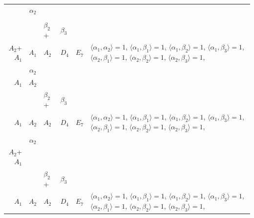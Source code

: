 \documentclass[12pt]{report}
\begin{document}
\begin{appendix}
{\begin{longtable}{rcl p{1cm}p{1cm}p{3cm} }
\\
\begin{tabular}{cc}$\alpha_1$+ & $\alpha_2$\\\tiny{  } & \tiny{  }\end{tabular} &\begin{tabular}{c} = \\~ \end{tabular} & \begin{tabular}{ccc}$\beta_1$+ & $\beta_2$+ & $\beta_3$\\\tiny{ $A_2$+$A_1$ } & \tiny{ $A_1$ } & \tiny{ $A_2$ }\end{tabular} & $D_4$ & $E_7$ & $\langle\alpha_1, \alpha_2\rangle=1$,  $\langle\alpha_1, \beta_1\rangle=1$, $\langle\alpha_1, \beta_2\rangle=1$, $\langle\alpha_1, \beta_3\rangle=1$, $\langle\alpha_2, \beta_1\rangle=1$, $\langle\alpha_2, \beta_2\rangle=1$, $\langle\alpha_2, \beta_3\rangle=1$, 
\\
\begin{tabular}{cc}$\alpha_1$+ & $\alpha_2$\\\tiny{ $A_1$ } & \tiny{ $A_2$ }\end{tabular} &\begin{tabular}{c} = \\~ \end{tabular} & \begin{tabular}{ccc}$\beta_1$+ & $\beta_2$+ & $\beta_3$\\\tiny{ $A_1$ } & \tiny{ $A_2$ } & \tiny{ $A_2$ }\end{tabular} & $D_4$ & $E_7$ & $\langle\alpha_1, \alpha_2\rangle=1$,  $\langle\alpha_1, \beta_1\rangle=1$, $\langle\alpha_1, \beta_2\rangle=1$, $\langle\alpha_1, \beta_3\rangle=1$, $\langle\alpha_2, \beta_1\rangle=1$, $\langle\alpha_2, \beta_2\rangle=1$, $\langle\alpha_2, \beta_3\rangle=1$, 
\\
\begin{tabular}{cc}$\alpha_1$+ & $\alpha_2$\\\tiny{ $A_2$+$A_1$ } & \tiny{  }\end{tabular} &\begin{tabular}{c} = \\~ \end{tabular} & \begin{tabular}{ccc}$\beta_1$+ & $\beta_2$+ & $\beta_3$\\\tiny{ $A_1$ } & \tiny{ $A_2$ } & \tiny{ $A_2$ }\end{tabular} & $D_4$ & $E_7$ & $\langle\alpha_1, \alpha_2\rangle=1$,  $\langle\alpha_1, \beta_1\rangle=1$, $\langle\alpha_1, \beta_2\rangle=1$, $\langle\alpha_1, \beta_3\rangle=1$, $\langle\alpha_2, \beta_1\rangle=1$, $\langle\alpha_2, \beta_2\rangle=1$, $\langle\alpha_2, \beta_3\rangle=1$, 

\end{longtable}}
\end{appendix}
\end{document}
